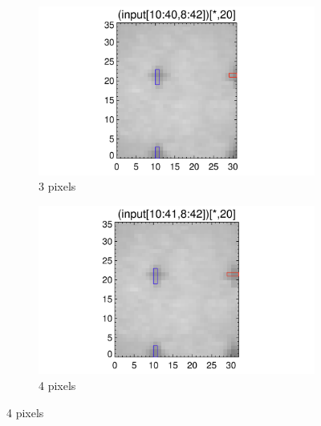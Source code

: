 \documentclass[10pt]{article}
\begin{document}
\begin{figure}[!h]
   \begin{subfigure}[b]{.45\linewidth}
        \centering
        \includegraphics[width=1.3\textwidth]{../plots_tables_images/fidcheck_newdegree2.png}
        \caption{3 pixels}
    \end{subfigure}
    \begin{subfigure}[b]{.45\linewidth}
        \centering
        \includegraphics[width=1.3\textwidth]{../plots_tables_images/fidcheck_newdegree3.png}
        \caption{4 pixels}
    \end{subfigure}


\end{figure}
\end{document}
